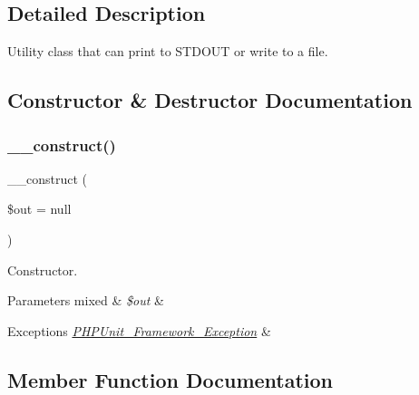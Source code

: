 \subsection{Detailed Description}
Utility class that can print to S\+T\+D\+O\+UT or write to a file. 

\subsection{Constructor \& Destructor Documentation}
\mbox{\label{class_p_h_p_unit___util___printer_a058d0261b18ee18c9fad1ffb1d08775c}} 
\subsubsection{\texorpdfstring{\+\_\+\+\_\+construct()}{\_\_construct()}}
{\footnotesize\ttfamily \+\_\+\+\_\+construct (\begin{DoxyParamCaption}\item[{}]{\$out = {\ttfamily null} }\end{DoxyParamCaption})}

Constructor.


\begin{DoxyParams}[1]{Parameters}
mixed & {\em \$out} & \\
\hline
\end{DoxyParams}

\begin{DoxyExceptions}{Exceptions}
{\em \mbox{\hyperlink{class_p_h_p_unit___framework___exception}{P\+H\+P\+Unit\+\_\+\+Framework\+\_\+\+Exception}}} & \\
\hline
\end{DoxyExceptions}


\subsection{Member Function Documentation}
\mbox{\label{class_p_h_p_unit___util___printer_a7751f77b5263bcf940ece6e824a05b38}} 
